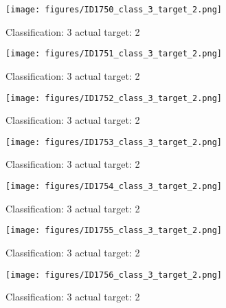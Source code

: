 \begin{figure}[h!]
\begin{center}
\texttt{[image: figures/ID1750\_class\_3\_target\_2.png]}
\end{center}
\caption{ Classification: 3 actual target: 2}
\label{fig:ID1750_class_3_target_2}
\end{figure}
\begin{figure}[h!]
\begin{center}
\texttt{[image: figures/ID1751\_class\_3\_target\_2.png]}
\end{center}
\caption{ Classification: 3 actual target: 2}
\label{fig:ID1751_class_3_target_2}
\end{figure}
\begin{figure}[h!]
\begin{center}
\texttt{[image: figures/ID1752\_class\_3\_target\_2.png]}
\end{center}
\caption{ Classification: 3 actual target: 2}
\label{fig:ID1752_class_3_target_2}
\end{figure}
\begin{figure}[h!]
\begin{center}
\texttt{[image: figures/ID1753\_class\_3\_target\_2.png]}
\end{center}
\caption{ Classification: 3 actual target: 2}
\label{fig:ID1753_class_3_target_2}
\end{figure}
\begin{figure}[h!]
\begin{center}
\texttt{[image: figures/ID1754\_class\_3\_target\_2.png]}
\end{center}
\caption{ Classification: 3 actual target: 2}
\label{fig:ID1754_class_3_target_2}
\end{figure}
\begin{figure}[h!]
\begin{center}
\texttt{[image: figures/ID1755\_class\_3\_target\_2.png]}
\end{center}
\caption{ Classification: 3 actual target: 2}
\label{fig:ID1755_class_3_target_2}
\end{figure}
\begin{figure}[h!]
\begin{center}
\texttt{[image: figures/ID1756\_class\_3\_target\_2.png]}
\end{center}
\caption{ Classification: 3 actual target: 2}
\label{fig:ID1756_class_3_target_2}
\end{figure}
